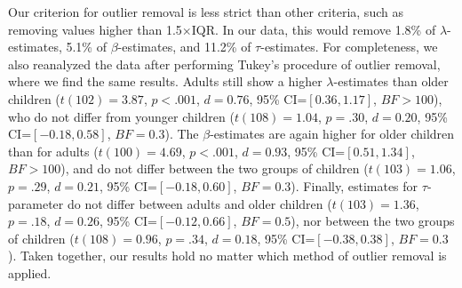 Our criterion for outlier removal is less strict than other criteria, such as removing values higher than 1.5$\times$IQR. In our data, this would remove 1.8\% of $\lambda$-estimates, 5.1\% of $\beta$-estimates, and 11.2\% of $\tau$-estimates. For completeness, we also reanalyzed the data after performing Tukey's procedure of outlier removal, where we find the same results. Adults still show a higher $\lambda$-estimates than older children ($t(102)=3.87$, $p<.001$, $d=0.76$, 95\% CI=$[0.36,1.17]$, $BF>100$), who do not differ from younger children ($t(108)=1.04$, $p=.30$, $d=0.20$, 95\% CI=$[-0.18, 0.58]$, $BF=0.3$). The $\beta$-estimates are again higher for older children than for adults ($t(100)=4.69$, $p<.001$, $d=0.93$, 95\% CI=$[0.51, 1.34]$, $BF>100$), and do not differ between the two groups of children ($t(103)=1.06$, $p=.29$, $d=0.21$, 95\% CI=$[-0.18, 0.60]$, $BF=0.3$). Finally, estimates for $\tau$-parameter do not differ between adults and older children ($t(103)=1.36$, $p=.18$, $d=0.26$, 95\% CI=$[-0.12, 0.66]$, $BF=0.5$), nor between the two groups of children ($t(108)=0.96$, $p=.34$, $d=0.18$, 95\% CI=$[-0.38, 0.38]$, $BF=0.3$). Taken together, our results hold no matter which method of outlier removal is applied.

